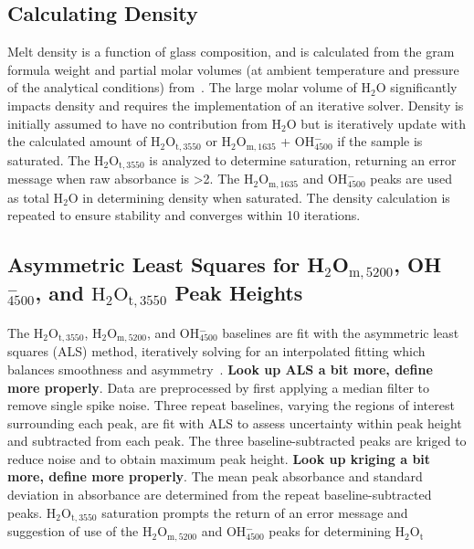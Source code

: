 \documentclass[draft]{agujournal2019}
\begin{document}
\subsection{Calculating Density}
Melt density is a function of glass composition, and is calculated from the gram formula weight and partial molar volumes (at ambient temperature and pressure of the analytical conditions) from~. The large molar volume of H$_{2}$O significantly impacts density and requires the implementation of an iterative solver. Density is initially assumed to have no contribution from H$_{2}$O but is iteratively update with the calculated amount of H$_{2}$O$_{\mathrm{t, 3550}}$ or H$_{2}$O$_{\mathrm{m, 1635}}$ + OH$^{-}_{4500}$ if the sample is saturated. The \textepsilon${\mathrm{H_2O_{t, 3550}}}$ is analyzed to determine saturation, returning an error message when raw absorbance is \textgreater 2. The H$_{2}$O$_{\mathrm{m}, 1635}$ and OH$^{-}_{4500}$ peaks are used as total H$_{2}$O in determining density when saturated. The density calculation is repeated to ensure stability and converges within 10 iterations. 

\subsection{Asymmetric Least Squares for H$_{2}$O$_{\mathrm{m}, 5200}$, OH$^{-}_{4500}$, and ${\mathrm{H_2O_{t, 3550}}}$ Peak Heights}

The ${\mathrm{H_2O_{t, 3550}}}$, H$_{2}$O$_{\mathrm{m}, 5200}$, and OH$^{-}_{4500}$ baselines are fit with the asymmetric least squares (ALS) method, iteratively solving for an interpolated fitting which balances smoothness and asymmetry~\cite{Eilers2004, Leeetal2017, Pengetal2010}. \textbf{Look up ALS a bit more, define more properly}. Data are preprocessed by first applying a median filter to remove single spike noise. Three repeat baselines, varying the regions of interest surrounding each peak, are fit with ALS to assess uncertainty within peak height and subtracted from each peak. The three baseline-subtracted peaks are kriged to reduce noise and to obtain maximum peak height. \textbf{Look up kriging a bit more, define more properly}. The mean peak absorbance and standard deviation in absorbance are determined from the repeat baseline-subtracted peaks. ${\mathrm{H_2O_{t, 3550}}}$ saturation prompts the return of an error message and suggestion of use of the H$_{2}$O$_{\mathrm{m}, 5200}$ and OH$^{-}_{4500}$ peaks for determining ${\mathrm{H_2O_{t}}}$
\end{document}

